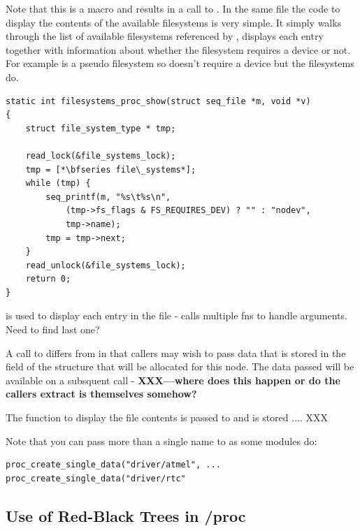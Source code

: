 \noindent
Note that this is a macro and results in a call to . In the same file the code to display the contents of the available filesystems is very simple. It simply walks through the list of available filesystems referenced by , displays each entry together with information about whether the filesystem requires a device or not. For example  is a pseudo filesystem so doesn't require a device but the  filesystems do.

\begin{lstlisting}
static int filesystems_proc_show(struct seq_file *m, void *v)
{
    struct file_system_type * tmp;

    read_lock(&file_systems_lock);
    tmp = [*\bfseries file\_systems*];
    while (tmp) {
        seq_printf(m, "%s\t%s\n",
            (tmp->fs_flags & FS_REQUIRES_DEV) ? "" : "nodev",
            tmp->name);
        tmp = tmp->next;
    }
    read_unlock(&file_systems_lock);
    return 0;
}
\end{lstlisting}

\noindent
{} is used to display each entry in the file - calls multiple fns to handle arguments. Need to find last one?

A call to  differs from  in that callers may wish to pass data that is stored in the  field of the  structure that will be allocated for this node. The data passed will be available on a subsquent call - \textbf{XXX---where does this happen or do the callers extract is themselves somehow?}

The function to display the file contents is passed to  and is stored .... XXX

Note that you can pass more than a single name to  as some modules do:

\begin{lstlisting}
proc_create_single_data("driver/atmel", ...
proc_create_single_data("driver/rtc"
\end{lstlisting}



\subsection{Use of Red-Black Trees in /proc}


